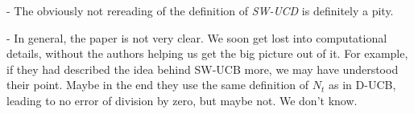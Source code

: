 - The obviously not rereading of the definition of \textit{SW-UCD} is definitely a pity.

- In general, the paper is not very clear. We soon get lost into computational details, without the authors helping us get the big picture out of it. For example, if they had described the idea behind SW-UCB more, we may have understood their point. Maybe in the end they use the same definition of $N_t$ as in D-UCB, leading to no error of division by zero, but maybe not. We don't know.
